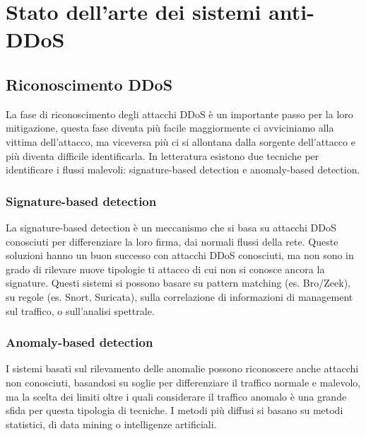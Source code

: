 \chapter{Stato dell'arte dei sistemi anti-DDoS}


\section{Riconoscimento DDoS}

La fase di riconoscimento degli attacchi DDoS è un importante passo per la loro mitigazione, questa fase diventa più facile maggiormente ci avviciniamo alla vittima dell'attacco, ma viceversa più ci si allontana dalla sorgente dell'attacco e più diventa difficile identificarla. In letteratura esistono due tecniche per identificare i flussi malevoli: signature-based detection e anomaly-based detection.

\subsection{Signature-based detection}

La signature-based detection è un meccanismo che si basa su attacchi DDoS conosciuti per differenziare la loro firma, dai normali flussi della rete. Queste soluzioni hanno un buon successo con attacchi DDoS conosciuti, ma non sono in grado di rilevare nuove tipologie ti attacco di cui non si conosce ancora la signature. Questi sistemi si possono basare su pattern matching (es. Bro/Zeek), su regole (es. Snort, Suricata), sulla correlazione di informazioni di management sul traffico, o sull'analisi spettrale.

\subsection{Anomaly-based detection}

I sistemi basati sul rilevamento delle anomalie possono riconoscere anche attacchi non conosciuti, basandosi su soglie per differenziare il traffico normale e malevolo, ma la scelta dei limiti oltre i quali considerare il traffico anomalo è una grande sfida per questa tipologia di tecniche.
I metodi più diffusi si basano su metodi statistici, di data mining o intelligenze artificiali.

